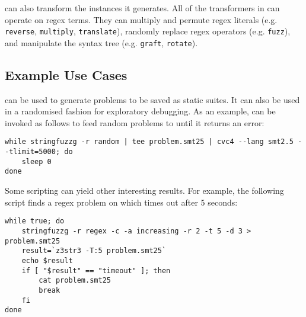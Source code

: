         \fuzzer{} can also transform the instances it generates. All of the transformers in \transformer{} can operate on regex terms. They can multiply and permute regex literals (e.g. \texttt{reverse}, \texttt{multiply}, \texttt{translate}), randomly replace regex operators (e.g. \texttt{fuzz}), and manipulate the syntax tree (e.g. \texttt{graft}, \texttt{rotate}).

        
\subsection{Example Use Cases}


        \fuzzer{} can be used to generate problems to be saved as static suites. It can also be used in a randomised fashion for exploratory debugging. As an example, \fuzzer{} can be invoked as follows to feed random problems to \cvc{} until it returns an error:
\begin{center}
\vspace{-0.05in}
\begin{varwidth}{\linewidth}
{\scriptsize\begin{verbatim}while stringfuzzg -r random | tee problem.smt25 | cvc4 --lang smt2.5 --tlimit=5000; do
    sleep 0
done
\end{verbatim}}
\end{varwidth}
\end{center}
        Some \unix{} scripting can yield other interesting results. For example, the following script finds a regex problem on which \us{} times out after 5 seconds:
\begin{center}
\vspace{-0.1in}
\begin{varwidth}{\linewidth}
        {\scriptsize\begin{verbatim}while true; do
    stringfuzzg -r regex -c -a increasing -r 2 -t 5 -d 3 > problem.smt25
    result=`z3str3 -T:5 problem.smt25`
    echo $result
    if [ "$result" == "timeout" ]; then
        cat problem.smt25
        break
    fi
done\end{verbatim}}
\end{varwidth}
\end{center}
